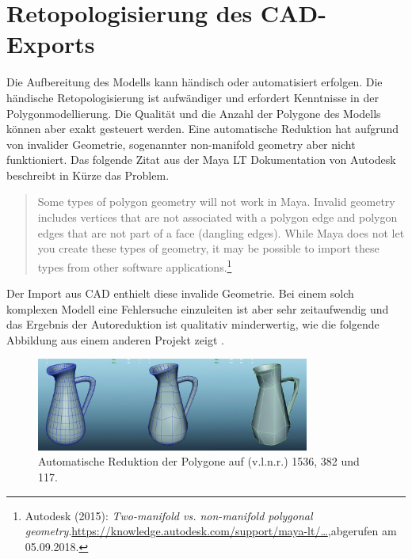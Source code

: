 \label{sec:RetopologisierungDesCAD-Exports}
\section{Retopologisierung des CAD-Exports}
Die Aufbereitung des Modells kann händisch oder automatisiert erfolgen. Die händische Retopologisierung ist aufwändiger und erfordert Kenntnisse in der Polygonmodellierung. Die Qualität und die Anzahl der Polygone des Modells können aber exakt gesteuert werden. Eine automatische Reduktion hat aufgrund von invalider Geometrie, sogenannter non-manifold geometry aber nicht funktioniert. Das folgende Zitat aus der Maya LT Dokumentation von Autodesk beschreibt in Kürze das Problem. 

\begin{quote}
\glqq Some types of polygon geometry will not work in Maya. Invalid geometry includes vertices that are not associated with a polygon edge and polygon edges that are not part of a face (dangling edges). While Maya does not let \clearpage
 you create these types of geometry, it may be possible to import these types from other software applications.\grqq\footnote{Autodesk  (2015): \textit{Two-manifold vs. non-manifold polygonal geometry}.\newline\href{https://knowledge.autodesk.com/support/maya-lt/learn-explore/caas/CloudHelp/cloudhelp/2015/ENU/MayaLT/files/Polygons-overview-Twomanifold-vs--nonmanifold-polygonal-geometry-htm.html}{https://knowledge.autodesk.com/support/maya-lt/\dots},\newline abgerufen am 05.09.2018.} 
\end{quote}

Der Import aus CAD enthielt diese invalide Geometrie. Bei einem solch komplexen Modell eine Fehlersuche einzuleiten ist aber sehr zeitaufwendig und das Ergebnis der Autoreduktion ist qualitativ minderwertig, wie die folgende Abbildung aus einem anderen Projekt zeigt . 

\begin{figure}[H]
	\centering
	\captionsetup{width=0.8\textwidth}
	\includegraphics[keepaspectratio, width=0.8\textwidth]{bildquellen/hp-zu-lp-automatisch}
	\caption{Automatische Reduktion der Polygone auf (v.l.n.r.) 1536, 382 und 117.}
	\label{fig:2.4}
\end{figure}

